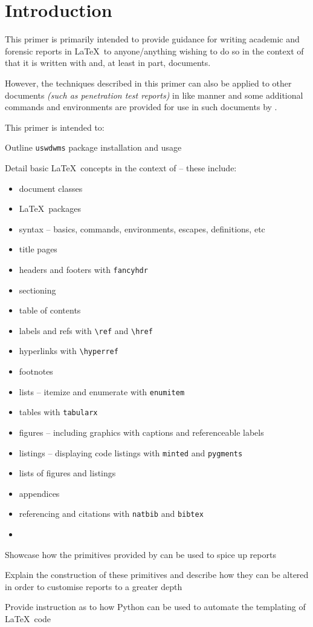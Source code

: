 \section{Introduction}
This primer is primarily intended to provide guidance for writing academic and forensic reports in \LaTeX\ to anyone/anything wishing to do so in the context of \uswdwmspkg{} that it is written with and, at least in part, documents.

However, the techniques described in this primer can also be applied to other documents \textit{(such as penetration test reports)} in like manner and some additional commands and environments are provided for use in such documents by \uswdwmspkg{}.

This primer is intended to:
\begin{methodology0}
  \item Outline \texttt{uswdwms} package installation and usage
  \item Detail basic \LaTeX\ concepts in the context of \uswdwmspkg{} -- these include:
    \begin{itemize}
      \item document classes
      \item \LaTeX\ packages
      \item syntax -- basics, commands, environments, escapes, definitions, etc
      \item title pages
      \item headers and footers with \texttt{fancyhdr}
      \item sectioning
      \item table of contents
      \item labels and refs with \texttt{\textbackslash ref} and \texttt{\textbackslash href}
      \item hyperlinks with \texttt{\textbackslash hyperref}
      \item footnotes
      \item lists -- itemize and enumerate with \texttt{enumitem}
      \item tables with \texttt{tabularx}
      \item figures -- including graphics with captions and referenceable labels
      \item listings -- displaying code listings with \texttt{minted} and \texttt{pygments}
      \item lists of figures and listings
      \item appendices
      \item referencing and citations with \texttt{natbib} and \texttt{bibtex}
      \item {}
    \end{itemize}
  \item Showcase how the primitives provided by \uswdwmspkg{} can be used to spice up reports
  \item Explain the construction of these primitives and describe how they can be altered in order to customise reports to a greater depth
  \item Provide instruction as to how Python can be used to automate the templating of \LaTeX\ code
\end{methodology0}
